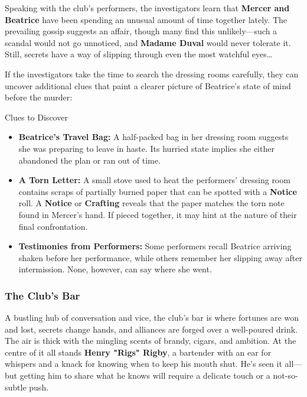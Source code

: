 Speaking with the club’s performers, the investigators learn that \textbf{Mercer and Beatrice} have been spending an unusual amount of time together lately. The prevailing gossip suggests an affair, though many find this unlikely—such a scandal would not go unnoticed, and \textbf{Madame Duval} would never tolerate it. Still, secrets have a way of slipping through even the most watchful eyes…


If the investigators take the time to search the dressing rooms carefully, they can uncover additional clues that paint a clearer picture of Beatrice’s state of mind before the murder:  

\begin{WyrdComment}{Clues to Discover}
	\begin{itemize}
		\item \textbf{Beatrice’s Travel Bag:} A half-packed bag in her dressing room suggests she was preparing to leave in haste. Its hurried state implies she either abandoned the plan or ran out of time.
		\item \textbf{A Torn Letter:} A small stove used to heat the performers' dressing room contains scraps of partially burned paper that can be spotted with a \Challenging \textbf{Notice} roll.
		A \Difficult \textbf{Notice} or \textbf{Crafting} reveals that the paper matches the torn note found in Mercer’s hand. If pieced together, it may hint at the nature of their final confrontation.
		\item \textbf{Testimonies from Performers:} Some performers recall Beatrice arriving shaken before her performance, while others remember her slipping away after intermission. None, however, can say where she went.
	\end{itemize}
\end{WyrdComment}


\subsubsection{The Club’s Bar}  
A bustling hub of conversation and vice, the club’s bar is where fortunes are won and lost, secrets change hands, and alliances are forged over a well-poured drink. The air is thick with the mingling scents of brandy, cigars, and ambition. At the centre of it all stands \textbf{Henry "Rigs" Rigby}, a bartender with an ear for whispers and a knack for knowing when to keep his mouth shut. He’s seen it all—but getting him to share what he knows will require a delicate touch or a not-so-subtle push.


